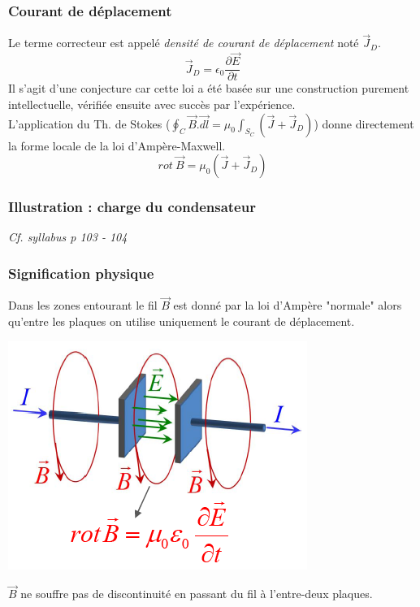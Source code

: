 \documentclass	[11pt, a4paper, openany]{book}
\begin{document}
	\subsubsection{Courant de déplacement}
	Le terme correcteur est appelé \textit{densité de courant de déplacement} noté $\vec{J}_D$.
	\begin{equation}
		\vec{J}_D = \epsilon_0 \frac{\partial \vec{E}}{\partial t}
	\end{equation}
	Il s'agit d'une conjecture car cette loi a été basée sur une construction purement intellectuelle, vérifiée ensuite avec succès par l'expérience.\\
	
	L'application du Th. de Stokes ($\oint_C \vec{B}.\vec{dl} = \mu_0 \int_{S_C}(\vec{J} + \vec{J}_D)$)  donne directement la forme locale de la loi d'Ampère-Maxwell.
	\begin{equation}
		rot\ \vec{B} = \mu_0 (\vec{J} + \vec{J}_D)
	\end{equation}
	
	\subsubsection{Illustration : charge du condensateur}
	\textit{Cf. syllabus p 103 - 104}
	
	\subsubsection*{Signification physique}
	Dans les zones entourant le fil $\vec{B}$ est donné par la loi d'Ampère "normale" alors qu'entre les plaques on utilise uniquement le courant de déplacement.
	\begin{center}
		\includegraphics[scale=0.55]{em/image28.png}\\
	\end{center}
	$\vec{B}$ ne souffre pas de discontinuité en passant du fil à l'entre-deux plaques.
	\newpage
\end{document}

